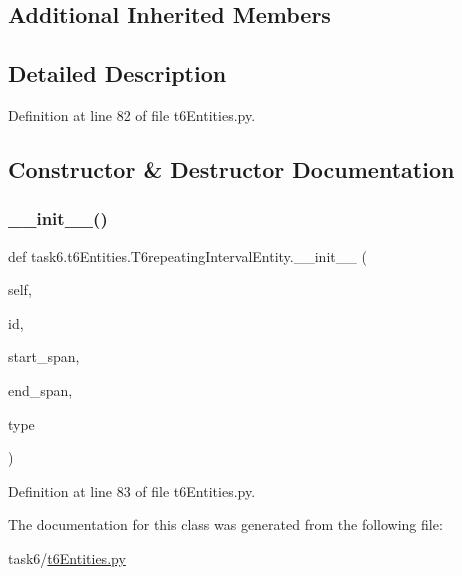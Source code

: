\subsection*{Additional Inherited Members}


\subsection{Detailed Description}


Definition at line 82 of file t6\+Entities.\+py.



\subsection{Constructor \& Destructor Documentation}
\mbox{\label{classtask6_1_1t6Entities_1_1T6repeatingIntervalEntity_a26cfdfdfe5c9a22651112680c641c159}} 
\subsubsection{\texorpdfstring{\+\_\+\+\_\+init\+\_\+\+\_\+()}{\_\_init\_\_()}}
{\footnotesize\ttfamily def task6.\+t6\+Entities.\+T6repeating\+Interval\+Entity.\+\_\+\+\_\+init\+\_\+\+\_\+ (\begin{DoxyParamCaption}\item[{}]{self,  }\item[{}]{id,  }\item[{}]{start\+\_\+span,  }\item[{}]{end\+\_\+span,  }\item[{}]{type }\end{DoxyParamCaption})}



Definition at line 83 of file t6\+Entities.\+py.



The documentation for this class was generated from the following file\+:\begin{DoxyCompactItemize}
\item 
task6/\hyperlink{t6Entities_8py}{t6\+Entities.\+py}\end{DoxyCompactItemize}
